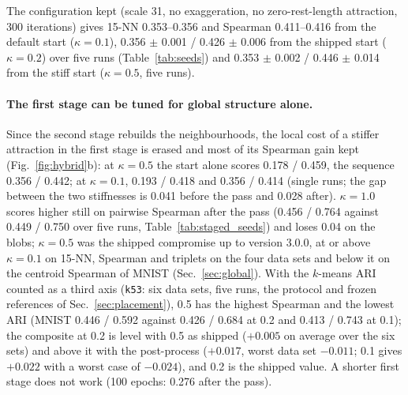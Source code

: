 \documentclass[11pt]{article}
\begin{document}
The configuration kept (scale 31, no exaggeration, no zero-rest-length attraction, 300 iterations) gives 15-NN
0.353--0.356 and Spearman 0.411--0.416 from the default start ($\kappa = 0.1$), 0.356 $\pm$ 0.001 /
0.426 $\pm$ 0.006 from the shipped start ($\kappa = 0.2$) over five runs (Table~\ref{tab:seeds}) and 0.353 $\pm$ 0.002 /
0.446 $\pm$ 0.014 from the stiff start ($\kappa = 0.5$, five runs).

\paragraph{The first stage can be tuned for global structure alone.} Since the second stage rebuilds
the neighbourhoods, the local cost of a stiffer attraction in the first stage is erased and most of its
Spearman gain kept (Fig.~\ref{fig:hybrid}b): at $\kappa = 0.5$ the start alone scores 0.178 / 0.459, the
sequence 0.356 / 0.442; at $\kappa = 0.1$, 0.193 / 0.418 and 0.356 / 0.414 (single runs; the gap between the
two stiffnesses is 0.041 before the pass and 0.028 after). $\kappa = 1.0$ scores higher still on
pairwise Spearman after the pass (0.456 / 0.764 against 0.449 / 0.750 over five runs,
Table~\ref{tab:staged_seeds}) and loses 0.04 on the blobs; $\kappa = 0.5$ was the shipped compromise up to version 3.0.0, at
or above $\kappa = 0.1$ on 15-NN, Spearman and triplets on the four data sets and below it on the
centroid Spearman of MNIST (Sec.~\ref{sec:global}). With the $k$-means ARI counted as a third axis
(\texttt{k53}: six data sets, five runs, the protocol and frozen references of Sec.~\ref{sec:placement}), 0.5 has
the highest Spearman and the lowest ARI (MNIST 0.446 / 0.592 against 0.426 / 0.684 at 0.2 and 0.413 / 0.743 at
0.1); the composite at 0.2 is level with 0.5 as shipped ($+0.005$ on average over the six sets) and above it with
the post-process ($+0.017$, worst data set $-0.011$; 0.1 gives $+0.022$ with a worst case of $-0.024$), and 0.2 is
the shipped value. A shorter first stage does not work (100 epochs:
0.276 after the pass).
\end{document}
